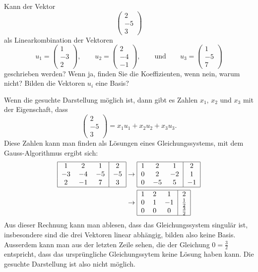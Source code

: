 Kann der Vektor
\[
\begin{pmatrix}
2\\-5\\3
\end{pmatrix}
\]
als Linearkombination der Vektoren
\[
u_1=\begin{pmatrix}
1\\-3\\2
\end{pmatrix},
\qquad
u_2=\begin{pmatrix}
2\\-4\\-1
\end{pmatrix},
\qquad\text{und}\qquad
u_3=\begin{pmatrix}
1\\-5\\7
\end{pmatrix}
\]
geschrieben werden? Wenn ja, finden Sie die Koeffizienten, wenn nein,
warum nicht? Bilden die Vektoren $u_i$ eine Basis?


\begin{loesung}
Wenn die gesuchte Darstellung möglich ist, dann gibt es Zahlen
$x_1$, $x_2$ und $x_3$ mit der Eigenschaft, dass
\[
\begin{pmatrix}
2\\-5\\3
\end{pmatrix}
=x_1u_1+x_2u_2+x_3u_3.
\]
Diese  Zahlen kann man finden als Lösungen eines Gleichungssystems,
mit dem Gauss-Algorithmus ergibt sich:
\begin{align*}
\begin{tabular}{|ccc|c|}
\hline
1&2&1&2\\
$-3$&$-4$&$-5$&$-5$\\
2&$-1$&7&3\\
\hline
\end{tabular}
&\rightarrow
\begin{tabular}{|ccc|c|}
\hline
1&2&1&2\\
0&2&$-2$&1\\
0&$-5$&5&$-1$\\
\hline
\end{tabular}
\\
&\rightarrow
\begin{tabular}{|ccc|c|}
\hline
1&2&1&2\\
0&1&$-1$&$\frac12$\\
0&0&0&$\frac32$\\
\hline
\end{tabular}
\end{align*}
Aus dieser Rechnung kann man ablesen, dass das Gleichungssystem singulär
ist, insbesondere sind die drei Vektoren linear abhängig, bilden also
keine Basis. Ausserdem kann man aus der letzten Zeile sehen, die der
Gleichung $0=\frac32$ entspricht, dass das ursprüngliche Gleichungssytem
keine Lösung haben kann. Die gesuchte Darstellung ist also nicht möglich.
\end{loesung}

